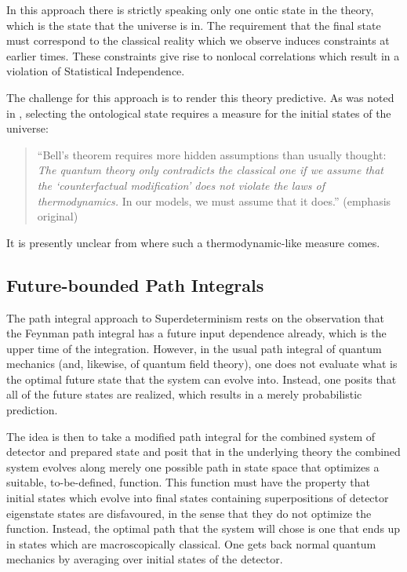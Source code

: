 \documentclass[12pt]{article}
\begin{document}
In this approach there is strictly speaking only one ontic state in the theory, which is the state that the universe is in. The requirement that the final state must correspond to the classical reality which we observe induces constraints at earlier times. These constraints give rise to nonlocal correlations which result in a violation of Statistical Independence. 

The challenge for this approach is to render this theory predictive. As was noted in \cite{Hooft:2014kka}, selecting the ontological state requires a measure for the initial states of the universe:

\begin{quote}
``Bell’s theorem
requires more hidden assumptions than usually thought: {\sl The quantum theory only
contradicts the classical one if we assume that the ‘counterfactual modification’
does not violate the laws of thermodynamics.} In our models, we must assume that it does.'' (emphasis original)
\end{quote}

\noindent It is presently unclear from where such a thermodynamic-like measure comes. 

\subsection{Future-bounded Path Integrals}
\label{path}

The path integral approach to Superdeterminism \cite{future} rests on the observation that the Feynman path integral has a future input dependence already, which is the upper time of the integration. However, in the usual path integral of quantum mechanics (and, likewise, of quantum field theory), one does not evaluate what is the optimal future state that the system can evolve into. Instead, one posits that all of the future states are realized, which results in a merely probabilistic prediction.

The idea is then to take a modified path integral for the combined system of detector and prepared state and posit that in the underlying theory the combined system evolves along merely one possible path in state space that optimizes a suitable, to-be-defined, function. This function must have the property that initial states which evolve into final states  containing superpositions of detector eigenstate states are disfavoured, in the sense that they do not optimize the function. Instead, the optimal path that the system will chose is one that ends up in states which are macroscopically classical. One gets back normal quantum mechanics by averaging over initial states of the detector.
\end{document}
